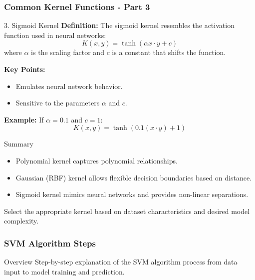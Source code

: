 \documentclass{beamer}
\begin{document}
\begin{frame}[fragile]
    \frametitle{Common Kernel Functions - Part 3}
    \begin{block}{3. Sigmoid Kernel}
        \textbf{Definition:}
        The sigmoid kernel resembles the activation function used in neural networks:
        \begin{equation}
        K(x, y) = \tanh(\alpha x \cdot y + c)
        \end{equation}
        where \( \alpha \) is the scaling factor and \( c \) is a constant that shifts the function.
        
        \textbf{Key Points:}
        \begin{itemize}
            \item Emulates neural network behavior.
            \item Sensitive to the parameters \( \alpha \) and \( c \).
        \end{itemize}
        
        \textbf{Example:}
        If \( \alpha = 0.1 \) and \( c = 1 \):
        \begin{equation}
        K(x, y) = \tanh(0.1(x \cdot y) + 1)
        \end{equation}
    \end{block}
    
    \begin{block}{Summary}
        \begin{itemize}
            \item Polynomial kernel captures polynomial relationships.
            \item Gaussian (RBF) kernel allows flexible decision boundaries based on distance.
            \item Sigmoid kernel mimics neural networks and provides non-linear separations.
        \end{itemize}
        Select the appropriate kernel based on dataset characteristics and desired model complexity.
    \end{block}
\end{frame}

\begin{frame}[fragile]
    \frametitle{SVM Algorithm Steps}
    \begin{block}{Overview}
        Step-by-step explanation of the SVM algorithm process from data input to model training and prediction.
    \end{block}
\end{frame}
\end{document}
